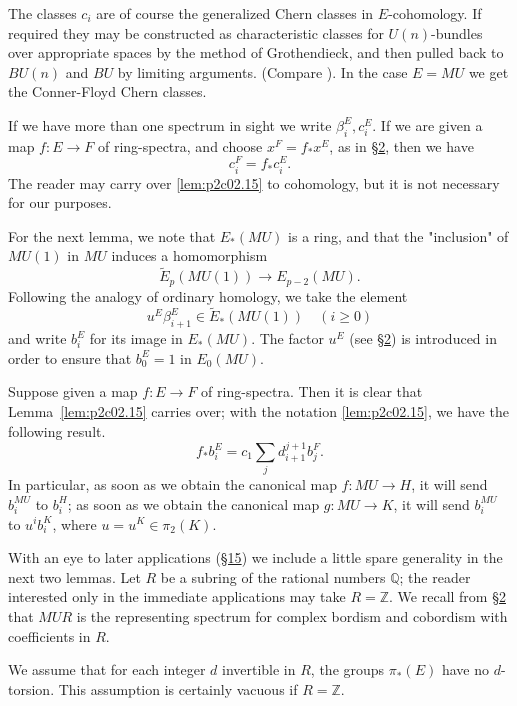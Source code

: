 \documentclass[../main]{subfiles}
\begin{document}
The classes $c_i$ are of course the generalized Chern classes in $E$-cohomology. If required they may be constructed as characteristic classes for $U(n)$-bundles over appropriate spaces by the method of Grothendieck, and then pulled back to $BU(n)$ and $BU$ by limiting arguments. (Compare \cite[pp.~8-9]{adams2}). In the case $E=MU$ we get the Conner-Floyd Chern classes.

If we have more than one spectrum in sight we write $\beta_i^E,c_i^E$. If we are given a map $f:E\longrightarrow F$ of ring-spectra, and choose $x^F=f_\ast x^E$, as in \hyperref[sec:p2c2]{\S 2}, then we have 
$$c_i^F=f_\ast c_i^E.$$
The reader may carry over \eqref{lem:p2c02.15} to cohomology, but it is not necessary for our purposes.

For the next lemma, we note that $E_\ast(MU)$ is a ring, and that the "inclusion" of $MU(1)$ in $MU$ induces a homomorphism
$$\tilde{E}_p(MU(1))\longrightarrow E_{p-2}(MU).$$
Following the analogy of ordinary homology, we take the element
$$u^E\beta_{i+1}^E\in \tilde{E}_\ast(MU(1)) \quad (i\geq 0)$$
and write $b_i^E$ for its image in $E_\ast(MU)$. The factor $u^E$ (see \hyperref[sec:p2c2]{\S 2}) is introduced in order to ensure that $b_0^E=1$ in $E_0(MU)$.

Suppose given a map $f:E\longrightarrow F$ of ring-spectra. Then it is clear that Lemma~\ref{lem:p2c02.15} carries over; with the notation \eqref{lem:p2c02.15}, we have the following result.
\begin{equation}
\label{eqn:p2c04.4}
\tag{4.4}
    f_\ast b_i^E=c_1\sum_jd_{i+1}^{j+1}b_j^F.
\end{equation}
In particular, as soon as we obtain the canonical map $f:MU\longrightarrow H$, it will send $b_i^{MU}$ to $b_i^H$; as soon as we obtain the canonical map $g:MU\longrightarrow K$, it will send $b_i^{MU}$ to $u^ib_i^K$, where $u=u^K\in \pi_2(K)$.

With an eye to later applications (\hyperref[sec:p2c15]{\S 15}) we include a little spare generality in the next two lemmas. Let $R$ be a subring of the rational numbers $\mathbb{Q}$; the reader interested only in the immediate applications may take $R=\mathbb{Z}$. We recall from \hyperref[sec:p2c2]{\S 2} that $MUR$ is the representing spectrum for complex bordism and cobordism with coefficients in $R$.

We assume that for each integer $d$ invertible in $R$, the groups $\pi_\ast(E)$ have no $d$-torsion. This assumption is certainly vacuous if $R=\mathbb{Z}$.
\end{document}
